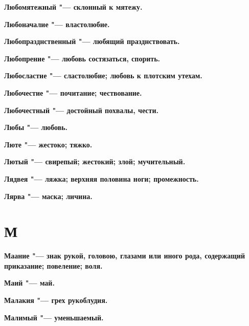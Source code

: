\begin{mymulticols}{2}
\bfseries Любомятежный\normalfont{} "--- склонный к мятежу. 




\bfseries Любоначалие\normalfont{} "--- властолюбие. 




\bfseries Любопразднственный\normalfont{} "--- любящий празднствовать. 




\bfseries Любопрение\normalfont{} "--- любовь состязаться, спорить. 




\bfseries Любосластие\normalfont{} "--- сластолюбие; любовь к плотским утехам. 




\bfseries Любочестие\normalfont{} "--- почитание; чествование. 




\bfseries Любочестный\normalfont{} "--- достойный похвалы, чести. 




\bfseries Любы\normalfont{} "--- любовь. 




\bfseries Люте\normalfont{} "--- жестоко; тяжко. 




\bfseries Лютый\normalfont{} "--- свирепый; жестокий; злой; мучительный. 




\bfseries Лядвея\normalfont{} "--- ляжка; верхняя половина ноги; промежность. 




\bfseries Лярва\normalfont{} "--- маска; личина. 




\section{М}





\bfseries Маание\normalfont{} "--- знак рукой, головою, глазами или иного рода, содержащий приказание; повеление; воля. 




\bfseries Маий\normalfont{} "--- май. 




\bfseries Малакия\normalfont{} "--- грех рукоблудия. 




\bfseries Малимый\normalfont{} "--- уменьшаемый. 





\end{mymulticols}
